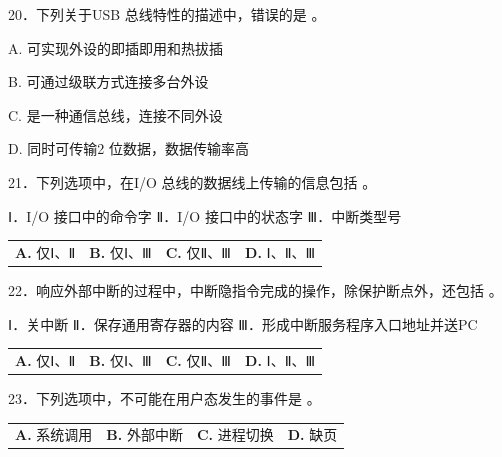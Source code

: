 \documentclass[UTF8,11pt]{ctexart}
\begin{document}
20．下列关于USB 总线特性的描述中，错误的是 。


A. 可实现外设的即插即用和热拔插


B. 可通过级联方式连接多台外设


C. 是一种通信总线，连接不同外设


D. 同时可传输2 位数据，数据传输率高


21．下列选项中，在I/O 总线的数据线上传输的信息包括 。


Ⅰ．I/O 接口中的命令字 Ⅱ．I/O 接口中的状态字 Ⅲ．中断类型号


\begin{center}\begin{tabular}{>{\raggedright\arraybackslash}p{\dimexpr(\linewidth-8\tabcolsep)/4\relax}>{\raggedright\arraybackslash}p{\dimexpr(\linewidth-8\tabcolsep)/4\relax}>{\raggedright\arraybackslash}p{\dimexpr(\linewidth-8\tabcolsep)/4\relax}>{\raggedright\arraybackslash}p{\dimexpr(\linewidth-8\tabcolsep)/4\relax}}
\textbf{A.} 仅Ⅰ、Ⅱ & \textbf{B.} 仅Ⅰ、Ⅲ & \textbf{C.} 仅Ⅱ、Ⅲ & \textbf{D.} Ⅰ、Ⅱ、Ⅲ\\[.35em]\end{tabular}\end{center}

22．响应外部中断的过程中，中断隐指令完成的操作，除保护断点外，还包括 。


Ⅰ．关中断 Ⅱ．保存通用寄存器的内容 Ⅲ．形成中断服务程序入口地址并送PC


\begin{center}\begin{tabular}{>{\raggedright\arraybackslash}p{\dimexpr(\linewidth-8\tabcolsep)/4\relax}>{\raggedright\arraybackslash}p{\dimexpr(\linewidth-8\tabcolsep)/4\relax}>{\raggedright\arraybackslash}p{\dimexpr(\linewidth-8\tabcolsep)/4\relax}>{\raggedright\arraybackslash}p{\dimexpr(\linewidth-8\tabcolsep)/4\relax}}
\textbf{A.} 仅Ⅰ、Ⅱ & \textbf{B.} 仅Ⅰ、Ⅲ & \textbf{C.} 仅Ⅱ、Ⅲ & \textbf{D.} Ⅰ、Ⅱ、Ⅲ\\[.35em]\end{tabular}\end{center}

23．下列选项中，不可能在用户态发生的事件是 。


\begin{center}\begin{tabular}{>{\raggedright\arraybackslash}p{\dimexpr(\linewidth-8\tabcolsep)/4\relax}>{\raggedright\arraybackslash}p{\dimexpr(\linewidth-8\tabcolsep)/4\relax}>{\raggedright\arraybackslash}p{\dimexpr(\linewidth-8\tabcolsep)/4\relax}>{\raggedright\arraybackslash}p{\dimexpr(\linewidth-8\tabcolsep)/4\relax}}
\textbf{A.} 系统调用 & \textbf{B.} 外部中断 & \textbf{C.} 进程切换 & \textbf{D.} 缺页\\[.35em]\end{tabular}\end{center}
\end{document}
